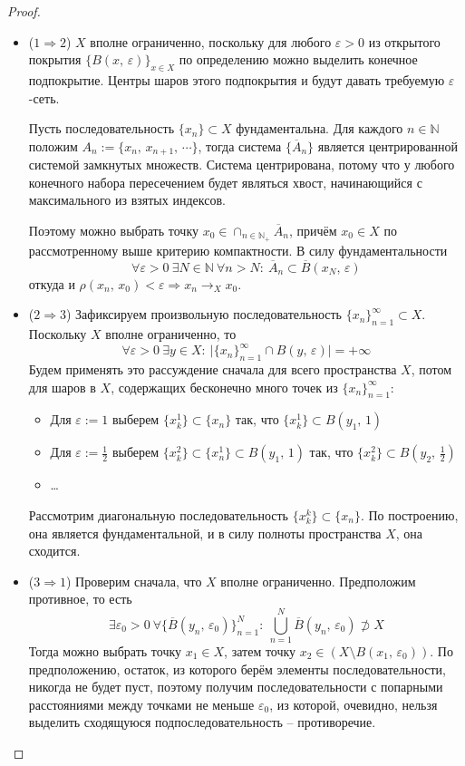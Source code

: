 \documentclass[a4paper,12pt]{article}
\theoremstyle{plain}
\theoremstyle{definition}
\theoremstyle{remark}
\begin{document}
\begin{proof}
	\begin{itemize}
		\item ($1 \Rightarrow 2$) $X$ вполне ограниченно, поскольку для любого $\varepsilon > 0$ из открытого покрытия $\{B(x,\, \varepsilon)\}_{x \in X}$ по определению можно выделить конечное подпокрытие. Центры шаров этого подпокрытия и будут давать требуемую $\varepsilon$-сеть.

		      Пусть последовательность $\{x_n\} \subset X$ фундаментальна. Для каждого $n \in \mathbb{N}$ положим $A_n := \{x_n,\, x_{n + 1},\, \cdots\}$, тогда система $\{\overline{A}_n\}$ является центрированной системой замкнутых множеств. Система центрирована, потому что у любого конечного набора пересечением будет являться хвост, начинающийся с максимального из взятых индексов.

		      Поэтому можно выбрать точку $x_0 \in \cap_{n \in \mathbb{N}_+} \overline{A}_n$, причём $x_0 \in X$ по рассмотренному выше критерию компактности. В силу фундаментальности
		      \[
			      \forall \varepsilon > 0 \: \exists N \in \mathbb{N} \: \forall n > N :\: \overline{A}_n \subset \overline{B}(x_N,\, \varepsilon)
		      \]
		      откуда и $\rho(x_n,\, x_0) < \varepsilon \Rightarrow x_n \to_X x_0$.
		\item ($2 \Rightarrow 3$) Зафиксируем произвольную последовательность $\{x_n\}_{n = 1}^\infty \subset X$. Поскольку $X$ вполне ограниченно, то
		      \[
			      \forall \varepsilon > 0 \: \exists y \in X :\: \vert\{x_n\}_{n = 1}^\infty \cap B(y,\, \varepsilon)\vert = +\infty
		      \]
		      Будем применять это рассуждение сначала для всего пространства $X$, потом для шаров в $X$, содержащих бесконечно много точек из $\{x_n\}_{n = 1}^\infty$:
		      \begin{itemize}
			      \item Для $\varepsilon := 1$ выберем $\{x_k^1\} \subset \{x_n\}$ так, что $\{x_k^1\} \subset B(y_1,\, 1)$
			      \item Для $\varepsilon := \frac{1}{2}$ выберем $\{x_k^2\} \subset \{x_n^1\} \subset B(y_1,\, 1)$ так, что $\{x_k^2\} \subset B(y_2,\, \frac{1}{2})$
			      \item \dots
		      \end{itemize}
		      Рассмотрим диагональную последовательность $\{x_k^k\} \subset \{x_n\}$. По построению, она является фундаментальной, и в силу полноты пространства $X$, она сходится.
		\item ($3 \Rightarrow 1$) Проверим сначала, что $X$ вполне ограниченно. Предположим противное, то есть
		      \[
			      \exists \varepsilon_0 > 0 \: \forall \{\overline{B}(y_n,\, \varepsilon_0)\}_{n = 1}^N :\: \bigcup_{n = 1}^N \overline{B}(y_n,\, \varepsilon_0) \not\supset X
		      \]
		      Тогда можно выбрать точку $x_1 \in X$, затем точку $x_2 \in (X \setminus B(x_1,\, \varepsilon_0))$. По предположению, остаток, из которого берём элементы последовательности, никогда не будет пуст, поэтому получим последовательности с попарными расстояниями между точками не меньше $\varepsilon_0$, из которой, очевидно, нельзя выделить сходящуюся подпоследовательность -- противоречие.


\end{itemize}
\end{proof}
\end{document}
